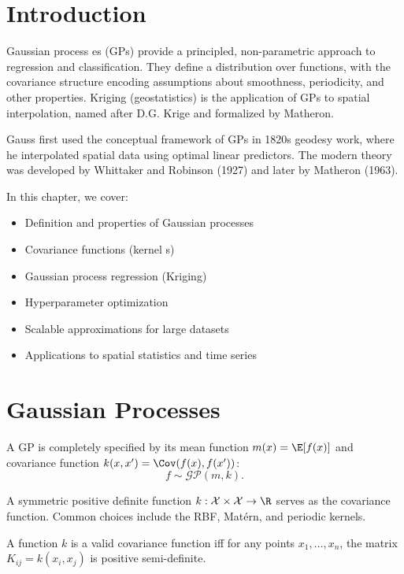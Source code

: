 \section{Introduction}

Gaussian process es (GPs) provide a principled, non-parametric approach to regression and classification. They define a distribution over functions, with the covariance structure encoding assumptions about smoothness, periodicity, and other properties. Kriging  (geostatistics) is the application of GPs to spatial interpolation, named after D.G. Krige and formalized by Matheron.

Gauss first used the conceptual framework of GPs in 1820s geodesy work, where he interpolated spatial data using optimal linear predictors. The modern theory was developed by Whittaker and Robinson (1927) and later by Matheron (1963).

In this chapter, we cover:
\begin{itemize}
    \item Definition and properties of Gaussian processes
    \item Covariance functions (kernel s)
    \item Gaussian process regression (Kriging)
    \item Hyperparameter optimization
    \item Scalable approximations for large datasets
    \item Applications to spatial statistics and time series
\end{itemize}

\section{Gaussian Processes}

A GP is completely specified by its mean function $m(x) = \E[f(x)]$ and covariance function  $k(x, x') = \Cov(f(x), f(x'))$:
\[
f \sim \mathcal{GP}(m, k).
\]

\begin{definition}
A symmetric positive definite function $k: \mathcal{X} \times \mathcal{X} \to \R$ serves as the covariance function. Common choices include the RBF, Matérn, and periodic kernels.
\end{definition}

\begin{theorem}
A function $k$ is a valid covariance function iff for any points $x_1, \ldots, x_n$, the matrix $K_{ij} = k(x_i, x_j)$ is positive semi-definite.
\end{theorem}

